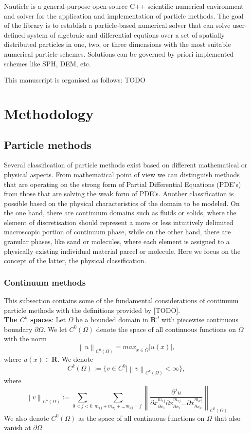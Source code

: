 \documentclass[a4paper,12pt,openany]{book}
\newcommand*{\SET}[1]  {\ensuremath{\mathbf{#1}}}
\newcommand{\R}{\SET{R}}
\newcommand{\norm}[1]{\left\lVert#1\right\rVert}
\theoremstyle{break}
\begin{document}
Nauticle is a general-purpose open-source C++ scientific numerical environment and solver for the application and implementation of particle methods. The goal of the library is to  establish a particle-based numerical solver that can solve user-defined system of algebraic and differential equtions over a set of spatially distributed particles in one, two, or three dimensions with the most suitable numerical particle-schemes. Solutions can be governed by priori implemented schemes like SPH, DEM, etc. 

This manuscript is organised as follows: TODO

\section{Methodology}
\subsection{Particle methods}
Several classification of particle methods exist based on different mathematical or physical aspects. From mathematical point of view we can distinguish methods that are operating on the strong form of Partial Differential Equations (PDE's) from those that are solving the weak form of PDE's. Another classification is possible based on the physical characteristics of the domain to be modeled. On the one hand, there are continuum domains such as fluids or solids, where the element of discretisation should represent a more or less intuitively delimited macroscopic portion of continuum phase, while on the other hand, there are granular phases, like sand or molecules, where each element is assigned to a physically existing individual material parcel or molecule. Here we focus on the concept of the latter, the physical classification.
\subsubsection{Continuum methods}
This subsection contains some of the fundamental considerations of continuum particle methods with the definitions provided by [TODO]. \\

\textbf{The $C^k$ spaces}: Let $\Omega$ be a bounded domain in $\R^d$ with piecewise continuous boundary $\partial\Omega$. We let $C^0(\Omega)$ denote the space of all continuous functions on $\overline{\Omega}$ with the norm
\begin{equation}
\norm{u}_{C^0(\Omega)}=max_{x\in\overline{\Omega}}|u(x)|,
\end{equation}
where $u(x)\in\R$. We denote
\begin{equation}
C^k(\Omega):=\{v\in C^0\vert\norm{v}_{C^k (\Omega)}<\infty\},
\end{equation}
where
\begin{equation}
\norm{v}_{C^k (\Omega)}:=\sum_{0<j<k}\sum_{m_{1j}+m_{2j}+...m_{dj}=j}\norm{\frac{\partial^j u}{\partial x^{m_{1j}}_{\partial x_1}\partial x^{m_{2j}}_{\partial x_2}...\partial x^{m_{dj}}_{\partial x_d}}}_{C^0(\Omega)}
\end{equation}
We also denote $C^0(\Omega)$ as the space of all continuous functions on $\Omega$ that also vanish at $\partial\Omega$
\end{document}
